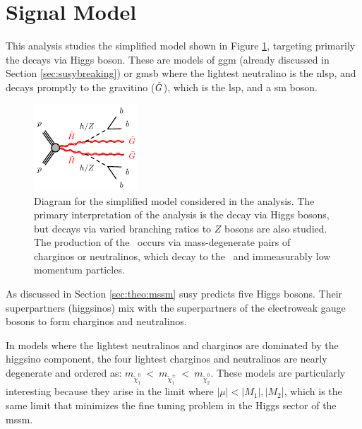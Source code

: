
\section{Signal Model}
\label{sec:ewk:sig}

This analysis studies the simplified model shown in Figure \ref{fig:feyn}, targeting primarily the decays via Higgs boson.
These are models of \gls{ggm} \cite{Meade:2008wd,Cheung:2007es,Dine:1981gu,AlvarezGaume:1981wy,Nappi:1982hm} 
(already discussed in Section \ref{sec:susybreaking})
or \gls{gmsb} \cite{Dimopoulos:1996vz,Matchev:1999ft} where 
the lightest neutralino is the \gls{nlsp}, and decays promptly to the gravitino ($\tilde{G}$), which is the \gls{lsp}, and 
a \gls{sm} boson. 

\begin{figure}[htbp]
	\centering
	\includegraphics[width=0.35\textwidth]{figures/ewk_prod/varie/N1N1-hhGG-bbbb_Z}
	\caption{Diagram for the simplified model considered in the analysis. The primary interpretation of the analysis is the decay via Higgs bosons, but decays via varied branching ratios to $Z$ bosons are also studied. The production of the \hino\ occurs
via mass-degenerate pairs of charginos or neutralinos, which decay to the \ninoone\ and immeasurably low momentum particles.} 
	\label{fig:feyn}
\end{figure}

As discussed in Section \ref{sec:theo:mssm} \gls{susy} predicts five Higgs bosons. 
Their superpartners (higgsinos) mix with the superpartners of the electroweak gauge bosons to form charginos and neutralinos.

In models where the lightest neutralinos and charginos are dominated by the higgsino component, the four lightest charginos 
and neutralinos are nearly degenerate \cite{Papucci:2011wy,Barbieri:2009ev,Han:2014kaa} and ordered as: $m_{\tilde\chi^0_1}~<~m_{\tilde\chi^\pm_1}~<~m_{\tilde\chi^0_2}$.
These models are particularly interesting because they arise in the limit where $|\mu| < |M_1|, |M_2$|, which is the same limit 
that minimizes the fine tuning problem in the Higgs sector of the \gls{mssm}.

